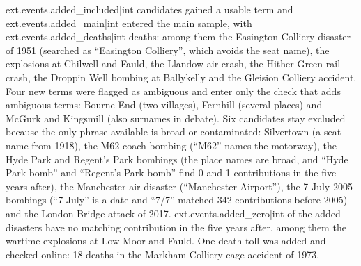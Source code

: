 \documentclass[11pt,a4paper]{article}
\begin{document}
{{ext.events.added_included|int}} candidates gained a usable term and {{ext.events.added_main|int}} entered the main sample, with {{ext.events.added_deaths|int}} deaths: among them the Easington Colliery disaster of 1951 (searched as ``Easington Colliery'', which avoids the seat name), the explosions at Chilwell and Fauld, the Llandow air crash, the Hither Green rail crash, the Droppin Well bombing at Ballykelly and the Gleision Colliery accident. Four new terms were flagged as ambiguous and enter only the check that adds ambiguous terms: Bourne End (two villages), Fernhill (several places) and McGurk and Kingsmill (also surnames in debate). Six candidates stay excluded because the only phrase available is broad or contaminated: Silvertown (a seat name from 1918), the M62 coach bombing (``M62'' names the motorway), the Hyde Park and Regent's Park bombings (the place names are broad, and ``Hyde Park bomb'' and ``Regent's Park bomb'' find 0 and 1 contributions in the five years after), the Manchester air disaster (``Manchester Airport''), the 7 July 2005 bombings (``7 July'' is a date and ``7/7'' matched 342 contributions before 2005) and the London Bridge attack of 2017. {{ext.events.added_zero|int}} of the added disasters have no matching contribution in the five years after, among them the wartime explosions at Low Moor and Fauld. One death toll was added and checked online: 18 deaths in the Markham Colliery cage accident of 1973.
\end{document}
